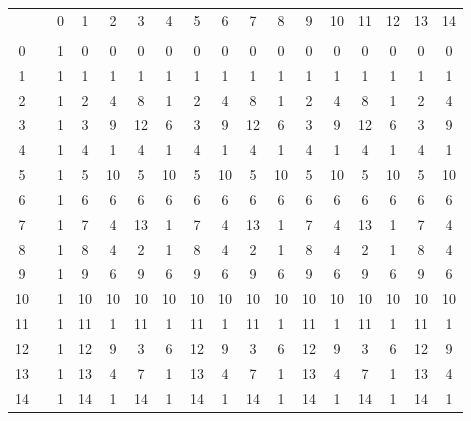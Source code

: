 \begin{footnotesize}
\begin{tabular}
    {c@{ }c@{ }c@{ }c@{ }c@{ }c@{ }c@{ }c@{ }c@{ }c@{ }c@{ }c@{ }c@{ }c@{ }c@{ }c@{ }c}
        & \phantom{X}
             &  0 &  1 &  2 &  3 &  4 &  5 &  6 &  7 &  8 &  9 & 10 & 11 & 12 & 13 & 14 \\
        &    & \phantom{10}  &    &    &    &    &    &    &    &    &    &    &    &    &    &    \\
    0   &    &  1 &  0 &  0 &  0 &  0 &  0 &  0 &  0 &  0 &  0 &  0 &  0 &  0 &  0 &  0 \\
    1   &    &  1 &  1 &  1 &  1 &  1 &  1 &  1 &  1 &  1 &  1 &  1 &  1 &  1 &  1 &  1 \\
    2   &    &  1 &  2 &  4 &  8 &  1 &  2 &  4 &  8 &  1 &  2 &  4 &  8 &  1 &  2 &  4 \\
    3   &    &  1 &  3 &  9 & 12 &  6 &  3 &  9 & 12 &  6 &  3 &  9 & 12 &  6 &  3 &  9 \\
    4   &    &  1 &  4 &  1 &  4 &  1 &  4 &  1 &  4 &  1 &  4 &  1 &  4 &  1 &  4 &  1 \\
    5   &    &  1 &  5 & 10 &  5 & 10 &  5 & 10 &  5 & 10 &  5 & 10 &  5 & 10 &  5 & 10 \\
    6   &    &  1 &  6 &  6 &  6 &  6 &  6 &  6 &  6 &  6 &  6 &  6 &  6 &  6 &  6 &  6 \\
    7   &    &  1 &  7 &  4 & 13 &  1 &  7 &  4 & 13 &  1 &  7 &  4 & 13 &  1 &  7 &  4 \\
    8   &    &  1 &  8 &  4 &  2 &  1 &  8 &  4 &  2 &  1 &  8 &  4 &  2 &  1 &  8 &  4 \\
    9   &    &  1 &  9 &  6 &  9 &  6 &  9 &  6 &  9 &  6 &  9 &  6 &  9 &  6 &  9 &  6 \\
   10   &    &  1 & 10 & 10 & 10 & 10 & 10 & 10 & 10 & 10 & 10 & 10 & 10 & 10 & 10 & 10 \\
   11   &    &  1 & 11 &  1 & 11 &  1 & 11 &  1 & 11 &  1 & 11 &  1 & 11 &  1 & 11 &  1 \\
   12   &    &  1 & 12 &  9 &  3 &  6 & 12 &  9 &  3 &  6 & 12 &  9 &  3 &  6 & 12 &  9 \\
   13   &    &  1 & 13 &  4 &  7 &  1 & 13 &  4 &  7 &  1 & 13 &  4 &  7 &  1 & 13 &  4 \\
   14   &    &  1 & 14 &  1 & 14 &  1 & 14 &  1 & 14 &  1 & 14 &  1 & 14 &  1 & 14 &  1 \\
\end{tabular}
\end{footnotesize}
